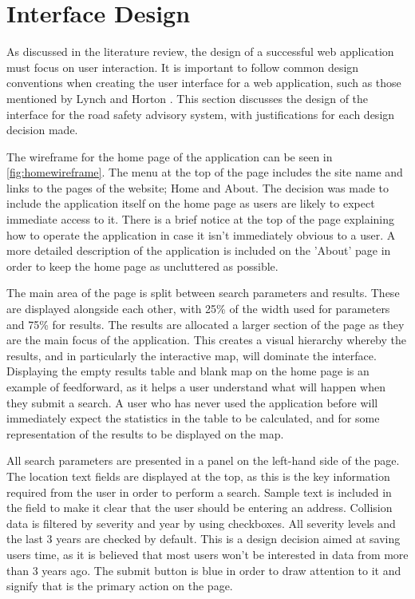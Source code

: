 \documentclass[authoryearcitations]{UoYCSproject}
\begin{document}
\section{Interface Design}

As discussed in the literature review, the design of a successful web application must focus on user interaction. It is important to follow common design conventions when creating the user interface for a web application, such as those mentioned by Lynch and Horton \citep{Lynch2009}. This section discusses the design of the interface for the road safety advisory system, with justifications for each design decision made.

The wireframe for the home page of the application can be seen in \autoref{fig:homewireframe}. The menu at the top of the page includes the site name and links to the pages of the website; Home and About. The decision was made to include the application itself on the home page as users are likely to expect immediate access to it. There is a brief notice at the top of the page explaining how to operate the application in case it isn't immediately obvious to a user. A more detailed description of the application is included on the 'About' page in order to keep the home page as uncluttered as possible. 

The main area of the page is split between search parameters and results. These are displayed alongside each other, with 25\% of the width used for parameters and 75\% for results. The results are allocated a larger section of the page as they are the main focus of the application. This creates a visual hierarchy whereby the results, and in particularly the interactive map, will dominate the interface. Displaying the empty results table and blank map on the home page is an example of feedforward, as it helps a user understand what will happen when they submit a search. A user who has never used the application before will immediately expect the statistics in the table to be calculated, and for some representation of the results to be displayed on the map. 

All search parameters are presented in a panel on the left-hand side of the page. The location text fields are displayed at the top, as this is the key information required from the user in order to perform a search. Sample text is included in the field to make it clear that the user should be entering an address. Collision data is filtered by severity and year by using checkboxes. All severity levels and the last 3 years are checked by default. This is a design decision aimed at saving users time, as it is believed that most users won't be interested in data from more than 3 years ago. The submit button is blue in order to draw attention to it and signify that is the primary action on the page.
\end{document}
